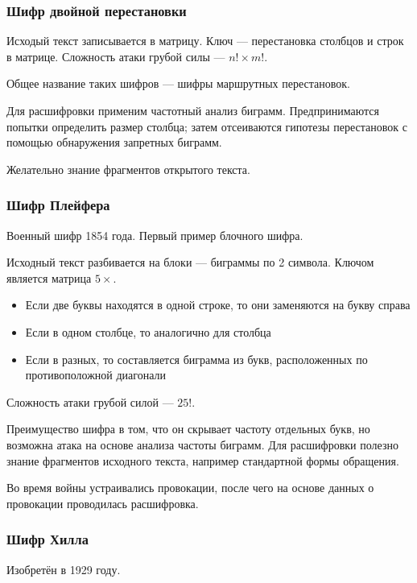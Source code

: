 \documentclass[a4paper, 14pt]{extarticle}
\begin{document}
\subsubsection{Шифр двойной перестановки}
Исходый текст записывается в матрицу. Ключ --- перестановка столбцов и строк в матрице. Сложность атаки грубой силы --- $n! \times m! $.


Общее название таких шифров --- шифры маршрутных перестановок.

Для расшифровки применим частотный анализ биграмм. Предпринимаются попытки определить размер столбца; затем отсеиваются гипотезы перестановок с помощью обнаружения запретных биграмм.

Желательно знание фрагментов открытого текста.

\subsubsection{Шифр Плейфера}
Военный шифр 1854 года. Первый пример блочного шифра. 

Исходный текст разбивается на блоки --- биграммы по 2 символа. Ключом является матрица $5\times$.
\begin{itemize}
    \item Если две буквы находятся в одной строке, то они заменяются на букву справа
    \item Если в одном столбце, то аналогично для столбца
    \item Если в разных, то составляется биграмма из букв, расположенных по противоположной диагонали
\end{itemize}


Сложность атаки грубой силой --- $25! $. 

Преимущество шифра в том, что он скрывает частоту отдельных букв, но возможна атака на основе анализа частоты биграмм. Для расшифровки полезно знание фрагментов исходного текста, например стандартной формы обращения.

Во время войны устраивались провокации, после чего на основе данных о провокации проводилась расшифровка.

\subsubsection{Шифр Хилла}
Изобретён в 1929 году. 
\end{document}

